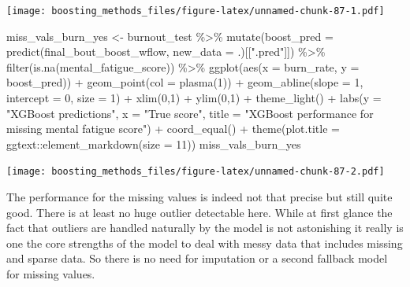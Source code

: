 \documentclass[
]{book}
\newenvironment{Shaded}{\begin{snugshade}}{\end{snugshade}}
\newcommand{\AttributeTok}[1]{\textcolor[rgb]{0.77,0.63,0.00}{#1}}
\newcommand{\DecValTok}[1]{\textcolor[rgb]{0.00,0.00,0.81}{#1}}
\newcommand{\FunctionTok}[1]{\textcolor[rgb]{0.00,0.00,0.00}{#1}}
\newcommand{\NormalTok}[1]{#1}
\newcommand{\OtherTok}[1]{\textcolor[rgb]{0.56,0.35,0.01}{#1}}
\newcommand{\SpecialCharTok}[1]{\textcolor[rgb]{0.00,0.00,0.00}{#1}}
\newcommand{\StringTok}[1]{\textcolor[rgb]{0.31,0.60,0.02}{#1}}
\begin{document}
\texttt{[image: boosting\_methods\_files/figure-latex/unnamed-chunk-87-1.pdf]}

\begin{Shaded}
\begin{Highlighting}[]
\NormalTok{miss\_vals\_burn\_yes }\OtherTok{\textless{}{-}}\NormalTok{ burnout\_test }\SpecialCharTok{\%\textgreater{}\%}
  \FunctionTok{mutate}\NormalTok{(}\AttributeTok{boost\_pred =} \FunctionTok{predict}\NormalTok{(final\_bout\_boost\_wflow,}
                              \AttributeTok{new\_data =}\NormalTok{ .)[[}\StringTok{".pred"}\NormalTok{]]) }\SpecialCharTok{\%\textgreater{}\%}
  \FunctionTok{filter}\NormalTok{(}\FunctionTok{is.na}\NormalTok{(mental\_fatigue\_score)) }\SpecialCharTok{\%\textgreater{}\%}
  \FunctionTok{ggplot}\NormalTok{(}\FunctionTok{aes}\NormalTok{(}\AttributeTok{x =}\NormalTok{ burn\_rate, }\AttributeTok{y =}\NormalTok{ boost\_pred)) }\SpecialCharTok{+}
  \FunctionTok{geom\_point}\NormalTok{(}\AttributeTok{col =} \FunctionTok{plasma}\NormalTok{(}\DecValTok{1}\NormalTok{)) }\SpecialCharTok{+} 
  \FunctionTok{geom\_abline}\NormalTok{(}\AttributeTok{slope =} \DecValTok{1}\NormalTok{, }\AttributeTok{intercept =} \DecValTok{0}\NormalTok{, }\AttributeTok{size =} \DecValTok{1}\NormalTok{) }\SpecialCharTok{+}
  \FunctionTok{xlim}\NormalTok{(}\DecValTok{0}\NormalTok{,}\DecValTok{1}\NormalTok{) }\SpecialCharTok{+} \FunctionTok{ylim}\NormalTok{(}\DecValTok{0}\NormalTok{,}\DecValTok{1}\NormalTok{) }\SpecialCharTok{+}
  \FunctionTok{theme\_light}\NormalTok{() }\SpecialCharTok{+}
  \FunctionTok{labs}\NormalTok{(}\AttributeTok{y =} \StringTok{"XGBoost predictions"}\NormalTok{,}
       \AttributeTok{x =} \StringTok{"True score"}\NormalTok{,}
       \AttributeTok{title =} \StringTok{"XGBoost performance for missing mental fatigue score"}\NormalTok{) }\SpecialCharTok{+}
  \FunctionTok{coord\_equal}\NormalTok{() }\SpecialCharTok{+}
  \FunctionTok{theme}\NormalTok{(}\AttributeTok{plot.title =}\NormalTok{ ggtext}\SpecialCharTok{::}\FunctionTok{element\_markdown}\NormalTok{(}\AttributeTok{size =} \DecValTok{11}\NormalTok{))}
\NormalTok{miss\_vals\_burn\_yes}
\end{Highlighting}
\end{Shaded}

\texttt{[image: boosting\_methods\_files/figure-latex/unnamed-chunk-87-2.pdf]}

The performance for the missing values is indeed not that precise but still quite good. There is at least no huge outlier detectable here. While at first glance the fact that outliers are handled naturally by the model is not astonishing it really is one the core strengths of the model to deal with messy data that includes missing and sparse data. So there is no need for imputation or a second fallback model for missing values.
\end{document}
